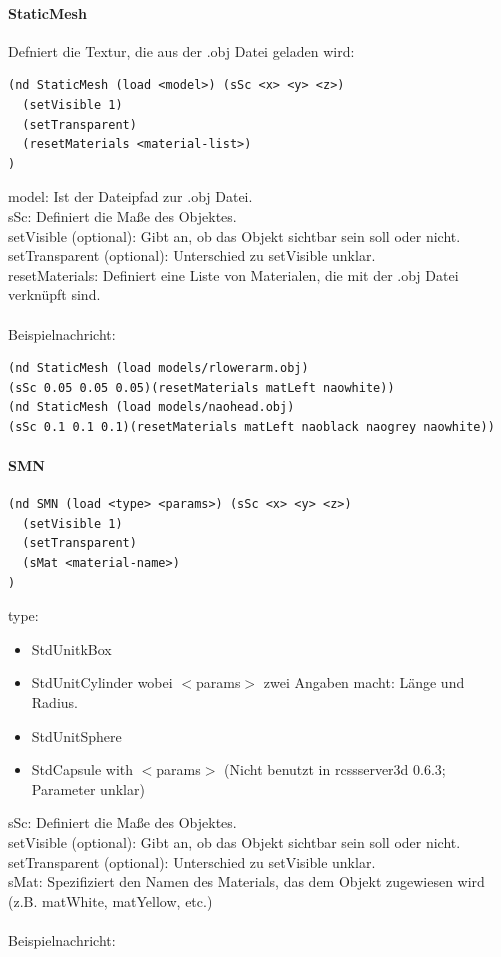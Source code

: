 \paragraph*{StaticMesh}
Defniert die Textur, die aus der .obj Datei geladen wird:

\begin{verbatim}(nd StaticMesh (load <model>) (sSc <x> <y> <z>)
  (setVisible 1)
  (setTransparent)
  (resetMaterials <material-list>)
)
\end{verbatim}
model: Ist der Dateipfad zur .obj Datei.\\
sSc: Definiert die Maße des Objektes.\\
setVisible (optional): Gibt an, ob das Objekt sichtbar sein soll oder nicht.\\
setTransparent (optional): Unterschied zu setVisible unklar.\\
resetMaterials: Definiert eine Liste von Materialen, die mit der .obj Datei verknüpft sind.\\
\\
Beispielnachricht:

\begin{verbatim}(nd StaticMesh (load models/rlowerarm.obj) 
(sSc 0.05 0.05 0.05)(resetMaterials matLeft naowhite))
(nd StaticMesh (load models/naohead.obj) 
(sSc 0.1 0.1 0.1)(resetMaterials matLeft naoblack naogrey naowhite))
\end{verbatim}
\paragraph*{SMN}
\begin{verbatim}(nd SMN (load <type> <params>) (sSc <x> <y> <z>)
  (setVisible 1)
  (setTransparent)
  (sMat <material-name>)
)
\end{verbatim}
type:

\begin{itemize}
\item  StdUnitkBox
\item  StdUnitCylinder wobei $<$params$>$ zwei Angaben macht: Länge und Radius.
\item  StdUnitSphere
\item  StdCapsule with $<$params$>$ (Nicht benutzt in rcssserver3d 0.6.3; Parameter unklar) 
\end{itemize}
sSc: Definiert die Maße des Objektes.\\
setVisible (optional): Gibt an, ob das Objekt sichtbar sein soll oder nicht.\\
setTransparent (optional): Unterschied zu setVisible unklar.\\
sMat: Spezifiziert den Namen des Materials, das dem Objekt zugewiesen wird (z.B. matWhite, matYellow, etc.)\\
\\
Beispielnachricht:

